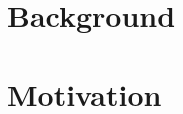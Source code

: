 \documentclass[senior,final,11pt]{iscs-thesis}
\begin{document}
\section{Background}



\section{Motivation}
\end{document}
